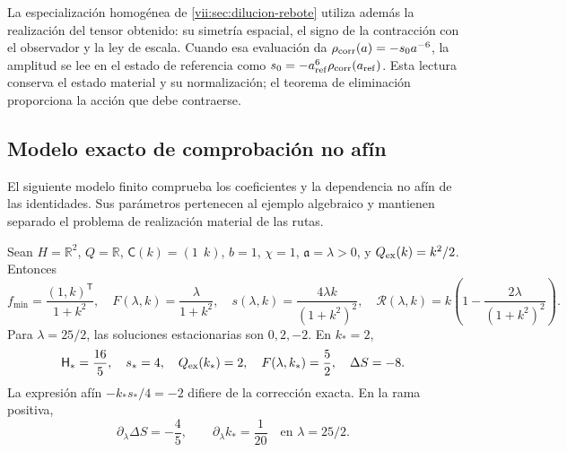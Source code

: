 La especialización homogénea de
\ref{vii:sec:dilucion-rebote} utiliza además la realización del
tensor obtenido: su simetría espacial, el signo de la contracción
con el observador y la ley de escala. Cuando esa evaluación da
\(\rho_{\rm corr}(a)=-s_0a^{-6}\), la amplitud se lee en el
estado de referencia como
\(s_0=-a_{\rm ref}^{6}\rho_{\rm corr}(a_{\rm ref})\).
Esta lectura conserva el estado material y su normalización; el
teorema de eliminación proporciona la acción que debe contraerse.

\subsection{Modelo exacto de comprobación no afín}
\label{vii:subsec:control-no-afin}

El siguiente modelo finito comprueba los coeficientes y la
dependencia no afín de las identidades. Sus parámetros pertenecen
al ejemplo algebraico y mantienen separado el problema de
realización material de las rutas.

\begin{proposition}
\label{vii:prop:ejemplo-no-afin}
Sean \(H=\mathbb R^2\), \(Q=\mathbb R\),
\(\mathsf C(k)=(1\ \ k)\), \(b=1\), \(\chi=1\),
\(\mathfrak a=\lambda>0\), y \(Q_{\rm ex}(k)=k^2/2\).
Entonces
\begin{equation}
 f_{\min}=\frac{(1,k)^{\mathsf T}}{1+k^2},\quad
 F(\lambda,k)=\frac{\lambda}{1+k^2},\quad
 s(\lambda,k)=\frac{4\lambda k}{(1+k^2)^2},\quad
 \mathcal R(\lambda,k)
    =k\left(1-\frac{2\lambda}{(1+k^2)^2}\right).
 \label{vii:eq:ejemplo-minimo-no-afin}
\end{equation}
Para \(\lambda=25/2\), las soluciones estacionarias son
\(0,2,-2\). En \(k_*=2\),
\begin{equation}
 \mathsf H_*=\frac{16}{5},\quad s_*=4,\quad
 Q_{\rm ex}(k_*)=2,\quad F(\lambda,k_*)=\frac52,
 \quad \Delta S=-8.
 \label{vii:eq:valores-ejemplo-no-afin}
\end{equation}
La expresión afín \(-k_*s_*/4=-2\) difiere de la corrección
exacta. En la rama positiva,
\begin{equation}
 \partial_\lambda\Delta S=-\frac45,
 \qquad \partial_\lambda k_* =\frac1{20}
 \quad\text{en }\lambda=25/2.
 \label{vii:eq:derivadas-ejemplo-no-afin}
\end{equation}
\end{proposition}


